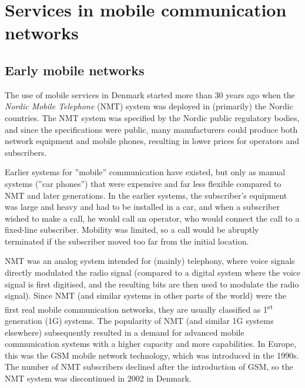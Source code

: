 \clearpage
\chapter{Services in mobile communication networks}
\label{sec:telenet_services}

\section{Early mobile networks}
The use of mobile services in Denmark started more than 30 years ago when the \emph{Nordic Mobile Telephone} (NMT) system was deployed in (primarily) the Nordic countries. The NMT system was specified by the Nordic public regulatory bodies, and since the specifications were public, many manufacturers could produce both network equipment and mobile phones, resulting in lower prices for operators and subscribers.

Earlier systems for ''mobile'' communication have existed, but only as manual systems (''car phones'') that were expensive and far less flexible compared to NMT and later generations. In the earlier systems, the subscriber's equipment was large and heavy and had to be installed in a car, and when a subscriber wished to make a call, he would call an operator, who would connect the call to a fixed-line subscriber. Mobility was limited, so a call would be abruptly terminated if the subscriber moved too far from the initial location.

NMT was an analog system intended for (mainly) telephony, where voice signals directly modulated the radio signal (compared to a digital system where the voice signal is first digitised, and the resulting bits are then used to modulate the radio signal). Since NMT (and similar systems in other parts of the world) were the first real mobile communication networks, they are usually classified as 1\textsuperscript{st} generation (1G) systems. The popularity of NMT (and similar 1G systems elsewhere) subsequently resulted in a demand for advanced mobile communication systems with a higher capacity and more capabilities. In Europe, this was the GSM mobile network technology, which was introduced in the 1990s. The number of NMT subscribers declined after the introduction of GSM, so the NMT system was discontinued in 2002 in Denmark.

